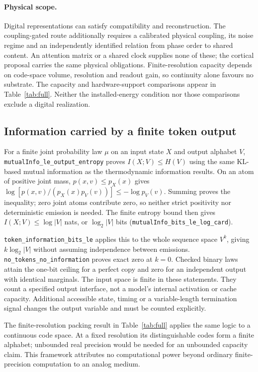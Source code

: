 \documentclass{article}
\begin{document}
\paragraph{Physical scope.} Digital representations can satisfy compatibility and reconstruction. The coupling-gated route additionally requires a calibrated physical coupling, its noise regime and an independently identified relation from phase order to shared content. An attention matrix or a shared clock supplies none of these; the cortical proposal carries the same physical obligations. Finite-resolution capacity depends on code-space volume, resolution and readout gain, so continuity alone favours no substrate. The capacity and hardware-support comparisons appear in Table~\ref{tab:full}. Neither the installed-energy condition nor those comparisons exclude a digital realization.

\subsection{Information carried by a finite token output}

For a finite joint probability law $\mu$ on an input state $X$ and output
alphabet $V$, \nolinkurl{mutualInfo_le_output_entropy}
proves $I(X;V)\leq H(V)$ using the same KL-based mutual information as the
thermodynamic information results. On an atom of positive joint mass,
$p(x,v)\leq p_X(x)$ gives
$\log[p(x,v)/(p_X(x)p_V(v))]\leq-\log p_V(v)$.
Summing proves the inequality; zero joint atoms contribute zero, so neither
strict positivity nor deterministic emission is needed.
The finite entropy bound then gives $I(X;V)\leq\log|V|$ nats, or
$\log_2|V|$ bits (\nolinkurl{mutualInfo_bits_le_log_card}).

\nolinkurl{token_information_bits_le}
applies this to the whole sequence space $V^k$, giving $k\log_2|V|$ without
assuming independence between emissions.
\nolinkurl{no_tokens_no_information}
proves exact zero at $k=0$. Checked binary laws attain the one-bit ceiling
for a perfect copy and zero for an independent output with identical marginals.
The input space is finite in these statements. They count a specified output
interface, not a model's internal activation or cache capacity. Additional
accessible state, timing or a variable-length termination signal changes the
output variable and must be counted explicitly.

The finite-resolution packing result in Table~\ref{tab:full} applies the same
logic to a continuous code space. At a fixed resolution its distinguishable
codes form a finite alphabet; unbounded real precision would be needed for an
unbounded capacity claim. This framework attributes no computational power
beyond ordinary finite-precision computation to an analog medium.
\end{document}
